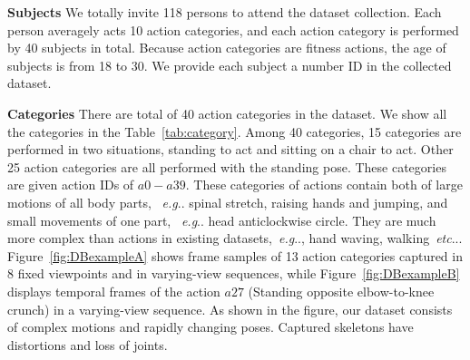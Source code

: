 \documentclass[journal]{IEEEtran}
\makeatletter
\DeclareRobustCommand\onedot{\futurelet\@let@token\@onedot}
\def\@onedot{\ifx\@let@token.\else.\null\fi\xspace}
\def\eg{\emph{e.g}\onedot} \def\Eg{\emph{E.g}\onedot}
\def\etc{\emph{etc}\onedot} \def\vs{\emph{vs}\onedot}
\makeatother
\begin{document}
\textbf{Subjects} We totally invite 118 persons to attend the dataset collection. Each person averagely acts 10 action categories, and each action category is performed by 40 subjects in total. Because action categories are fitness actions, the age of subjects is from 18 to 30. We provide each subject a number ID in the collected dataset.

\textbf{Categories} There are total of 40 action categories in the dataset. We show all the categories in the Table~\ref{tab:category}.
Among 40 categories, 15 categories are performed in two situations, standing to act and sitting on a chair to act. Other 25 action categories are all performed with the standing pose. These categories are given action IDs of $a0-a39$. These categories of actions contain both of large motions of all body parts, ~\eg spinal stretch, raising hands and jumping, and small movements of one part, ~\eg head anticlockwise circle. They are much more complex than actions in existing datasets,~\eg, hand waving, walking~\etc. Figure~\ref{fig:DBexampleA} shows frame samples of 13 action categories captured in 8 fixed viewpoints and in varying-view sequences, while Figure~\ref{fig:DBexampleB} displays temporal frames of the action $a27$ (Standing opposite elbow-to-knee crunch) in a varying-view sequence. As shown in the figure, our dataset consists of complex motions and rapidly changing poses. Captured skeletons have distortions and loss of joints.
\end{document}
